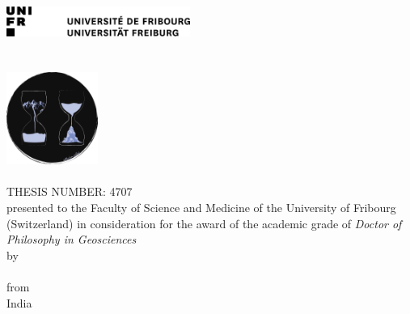 \begin{titlepage}
	\tgherosfont
	\centering

	\includegraphics[width=6cm]{figs/unifr-logo} \\[2mm]
	\textsf{\thesisUniversityDepartment} \\
	\textsf{\thesisUniversityGroup} \\

	\vfill
	\includegraphics[width=3cm]{figs/air_logo_circle} \\[2mm]
	{\LARGE \color{ctcolortitle}\textbf{\thesisTitle} \\[10mm]}
	{\Large THESIS NUMBER: 4707} \\
	{\small presented to the Faculty of Science and Medicine of the University of Fribourg (Switzerland)
in consideration for the award of the academic grade of
\textit{Doctor of Philosophy in Geosciences}} \\
\bigskip
	{\small by} \\
  \smallskip
	{\Large \thesisName} \\
  \smallskip
	{\small from} \\
  \smallskip
	{\Large India} \\
	\vfill

\end{titlepage}
